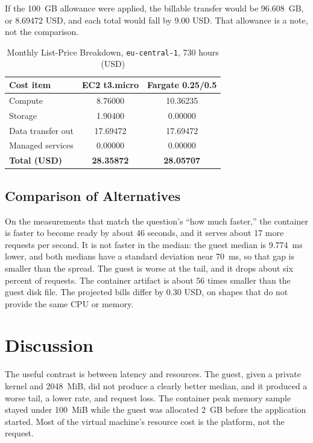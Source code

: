 \documentclass[conference,a4paper]{IEEEtran}
\begin{document}
If the 100~GB allowance were applied, the billable transfer would be 96.608~GB, or 8.69472 USD, and each total would fall by 9.00 USD. That allowance is a note, not the comparison.

\begin{table}[htbp]
	\caption{Monthly List-Price Breakdown, \texttt{eu-central-1}, 730 hours (USD)}
	\label{tab:cost}
	\begin{center}
		\footnotesize
		\begin{tabular}{|l|c|c|}
			\hline
			\textbf{Cost item} & \textbf{EC2 t3.micro} & \textbf{Fargate 0.25/0.5} \\
			\hline
			Compute & 8.76000 & 10.36235 \\
			\hline
			Storage & 1.90400 & 0.00000 \\
			\hline
			Data transfer out & 17.69472 & 17.69472 \\
			\hline
			Managed services & 0.00000 & 0.00000 \\
			\hline
			\textbf{Total (USD)} & \textbf{28.35872} & \textbf{28.05707} \\
			\hline
		\end{tabular}
	\end{center}
\end{table}

\subsection{Comparison of Alternatives}

On the measurements that match the question's ``how much faster,'' the container is faster to become ready by about 46 seconds, and it serves about 17 more requests per second. It is not faster in the median: the guest median is 9.774~ms lower, and both medians have a standard deviation near 70~ms, so that gap is smaller than the spread. The guest is worse at the tail, and it drops about six percent of requests. The container artifact is about 56 times smaller than the guest disk file. The projected bills differ by 0.30 USD, on shapes that do not provide the same CPU or memory.

\section{Discussion}
\label{sec:discussion}

The useful contrast is between latency and resources. The guest, given a private kernel and 2048~MiB, did not produce a clearly better median, and it produced a worse tail, a lower rate, and request loss. The container peak memory sample stayed under 100~MiB while the guest was allocated 2~GB before the application started. Most of the virtual machine's resource cost is the platform, not the request.
\end{document}
